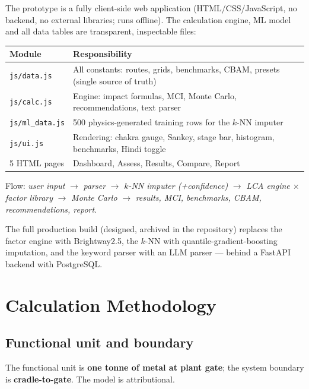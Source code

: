 \documentclass[11pt,a4paper]{article}
\begin{document}
The prototype is a fully client-side web application (HTML/CSS/JavaScript, no backend, no
external libraries; runs offline). The calculation engine, ML model and all data tables are
transparent, inspectable files:

\begin{center}
\begin{tabular}{@{}ll@{}}
\toprule
\textbf{Module} & \textbf{Responsibility} \\
\midrule
\texttt{js/data.js}    & All constants: routes, grids, benchmarks, CBAM, presets (single source of truth) \\
\texttt{js/calc.js}    & Engine: impact formulas, MCI, Monte Carlo, recommendations, text parser \\
\texttt{js/ml\_data.js} & 500 physics-generated training rows for the $k$-NN imputer \\
\texttt{js/ui.js}      & Rendering: chakra gauge, Sankey, stage bar, histogram, benchmarks, Hindi toggle \\
5 HTML pages           & Dashboard, Assess, Results, Compare, Report \\
\bottomrule
\end{tabular}
\end{center}

Flow: \emph{user input} $\rightarrow$ \emph{parser} $\rightarrow$ \emph{$k$-NN imputer
(+confidence)} $\rightarrow$ \emph{LCA engine $\times$ factor library} $\rightarrow$
\emph{Monte Carlo} $\rightarrow$ \emph{results, MCI, benchmarks, CBAM, recommendations,
report}.

The full production build (designed, archived in the repository) replaces the factor engine
with Brightway2.5, the $k$-NN with quantile-gradient-boosting imputation, and the keyword
parser with an LLM parser --- behind a FastAPI backend with PostgreSQL.

\section{Calculation Methodology}

\subsection{Functional unit and boundary}
The functional unit is \textbf{one tonne of metal at plant gate}; the system boundary is
\textbf{cradle-to-gate}. The model is attributional.
\end{document}
